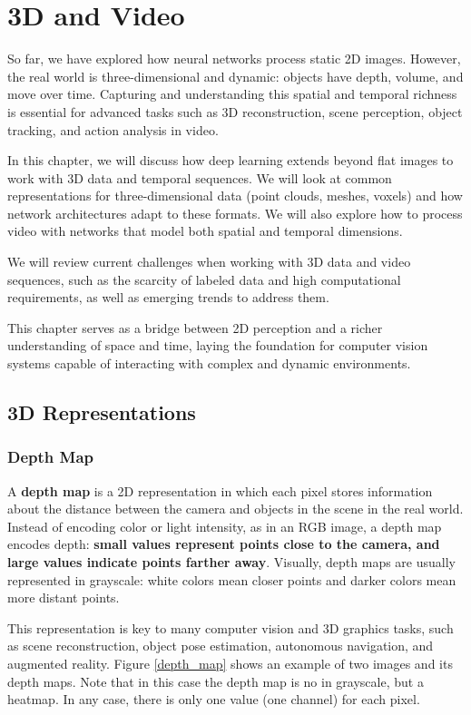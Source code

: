\chapter{3D and Video}

So far, we have explored how neural networks process static 2D images. However, the real world is three-dimensional and dynamic: objects have depth, volume, and move over time. Capturing and understanding this spatial and temporal richness is essential for advanced tasks such as 3D reconstruction, scene perception, object tracking, and action analysis in video.

In this chapter, we will discuss how deep learning extends beyond flat images to work with 3D data and temporal sequences. We will look at common representations for three-dimensional data (point clouds, meshes, voxels) and how network architectures adapt to these formats. We will also explore how to process video with networks that model both spatial and temporal dimensions.

We will review current challenges when working with 3D data and video sequences, such as the scarcity of labeled data and high computational requirements, as well as emerging trends to address them.

This chapter serves as a bridge between 2D perception and a richer understanding of space and time, laying the foundation for computer vision systems capable of interacting with complex and dynamic environments.



\section{3D Representations}

\subsection{Depth Map}

A \textbf{depth map} is a 2D representation in which each pixel stores information about the distance between the camera and objects in the scene in the real world. Instead of encoding color or light intensity, as in an RGB image, a depth map encodes depth: \textbf{small values represent points close to the camera, and large values indicate points farther away}. Visually, depth maps are usually represented in grayscale: white colors mean closer points and darker colors mean more distant points.

This representation is key to many computer vision and 3D graphics tasks, such as scene reconstruction, object pose estimation, autonomous navigation, and augmented reality. Figure \ref{depth_map} shows an example of two images and its depth maps. Note that in this case the depth map is no in grayscale, but a heatmap. In any case, there is only one value (one channel) for each pixel.

